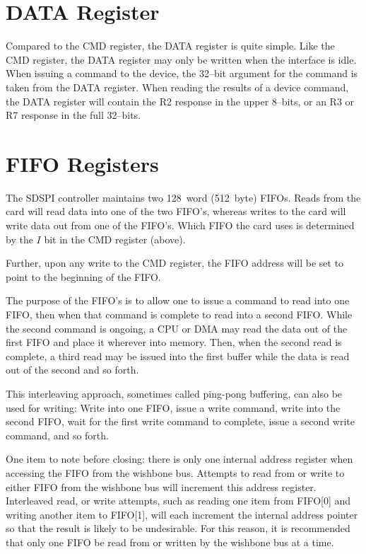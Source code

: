 \documentclass{gqtekspec}
\begin{document}
\section{DATA Register}
Compared to the CMD register, the DATA register is quite simple.  Like the
CMD register, the DATA register may only be written when the interface is
idle.  When issuing a command to the device, the 32--bit argument for the
command is taken from the DATA register.  When reading the results of a device
command, the DATA register will contain the R2 response in the upper 8--bits,
or an R3 or R7 response in the full 32--bits.  

\section{FIFO Registers}
The SDSPI controller maintains two 128~word (512~byte) FIFOs.  Reads from the 
card will read data into one of the two FIFO's, whereas writes to the card will
write data out from one of the FIFO's.  Which FIFO the card uses is determined
by the $I$ bit in the CMD register (above).

Further, upon any write to the CMD register, the FIFO address will be set
to point to the beginning of the FIFO.

The purpose of the FIFO's is to allow one to issue a command to read into one
FIFO, then when that command is complete to read into a second FIFO.  While
the second command is ongoing, a CPU or DMA may read the data out of the first
FIFO and place it wherever into memory.  Then, when the second read is complete,
a third read may be issued into the first buffer while the data is read out of
the second and so forth.

This interleaving approach, sometimes called ping-pong buffering, can also be
used for writing: Write into one FIFO, issue a write command, write into the
second FIFO, wait for the first write command to complete, issue a second
write command, and so forth.

One item to note before closing: there is only one internal address register
when accessing the FIFO from the wishbone bus.  Attempts to read from or write
to either FIFO from the wishbone bus will increment this address register. 
Interleaved read, or write attempts, such as reading one item from
FIFO[0] and writing another item to FIFO[1], will each increment the internal
address pointer so that the result is likely to be undesirable.  For this
reason, it is recommended that only one FIFO be read from or written by the
wishbone bus at a time.
\end{document}
